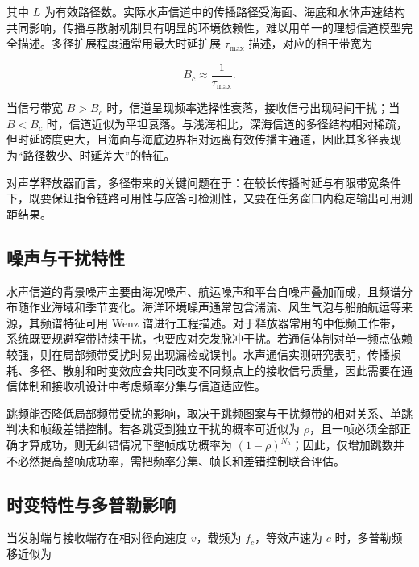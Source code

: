 其中 $L$ 为有效路径数。实际水声信道中的传播路径受海面、海底和水体声速结构共同影响，传播与散射机制具有明显的环境依赖性，难以用单一的理想信道模型完全描述\cite{kilfoyleStateArtUnderwater2000,vanWalreePropagationScatteringEffects2013}。多径扩展程度通常用最大时延扩展 $\tau_{\max}$ 描述，对应的相干带宽为

\begin{equation}
  B_c \approx \frac{1}{\tau_{\max}}.
  \label{eq:coherence_bw}
\end{equation}

当信号带宽 $B > B_c$ 时，信道呈现频率选择性衰落，接收信号出现码间干扰；当 $B < B_c$ 时，信道近似为平坦衰落。与浅海相比，深海信道的多径结构相对稀疏，但时延跨度更大，且海面与海底边界相对远离有效传播主通道，因此其多径表现为“路径数少、时延差大”的特征。

对声学释放器而言，多径带来的关键问题在于：在较长传播时延与有限带宽条件下，既要保证指令链路可用性与应答可检测性，又要在任务窗口内稳定输出可用测距结果。

\subsection{噪声与干扰特性}
\label{sec:chap02_noise}

水声信道的背景噪声主要由海况噪声、航运噪声和平台自噪声叠加而成，且频谱分布随作业海域和季节变化。海洋环境噪声通常包含湍流、风生气泡与船舶航运等来源，其频谱特征可用 Wenz 谱进行工程描述\cite{wenzAcousticAmbientNoise1962}。对于释放器常用的中低频工作带，系统既要规避窄带持续干扰，也要应对突发脉冲干扰。若通信体制对单一频点依赖较强，则在局部频带受扰时易出现漏检或误判。水声通信实测研究表明，传播损耗、多径、散射和时变效应会共同改变不同频点上的接收信号质量，因此需要在通信体制和接收机设计中考虑频率分集与信道适应性\cite{freitagAnalysisChannelEffects2001,liuProspectsProblemsWireless2008,vanWalreePropagationScatteringEffects2013}。

跳频能否降低局部频带受扰的影响，取决于跳频图案与干扰频带的相对关系、单跳判决和帧级差错控制。若各跳受到独立干扰的概率可近似为 $\rho$，且一帧必须全部正确才算成功，则无纠错情况下整帧成功概率为 $(1-\rho)^{N_h}$；因此，仅增加跳数并不必然提高整帧成功率，需把频率分集、帧长和差错控制联合评估。

\subsection{时变特性与多普勒影响}

当发射端与接收端存在相对径向速度 $v$，载频为 $f_c$，等效声速为 $c$ 时，多普勒频移近似为

